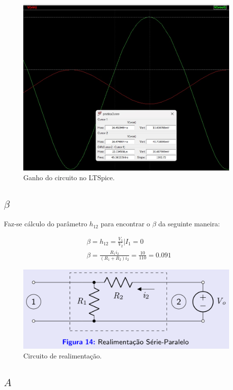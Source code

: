 \begin{figure}[h]
    \centering
    \includegraphics[width=0.8\columnwidth]{Images/circuito_ltspice_ganho.jpeg}
    \caption{Ganho do circuito no LTSpice.}
\end{figure}

\subsection{$\beta$}

Faz-se cálculo do parâmetro $h_{12}$ para encontrar o $\beta$ da seguinte maneira:

\begin{equation}
    \begin{aligned}
         & \beta = h_{12} = \frac{V_1}{V_2} | I_1 = 0                                    \\
         & \beta = \frac{R_1 i_2}{\left( R_1 + R_2 \right) i_2} = \frac{10}{110} = 0.091
    \end{aligned}
\end{equation}

\begin{figure}[h]
    \centering
    \includegraphics[width=0.5\columnwidth]{Images/realimentacao_beta.png}
    \caption{Circuito de realimentação.}
\end{figure}

\subsection{$A$}

